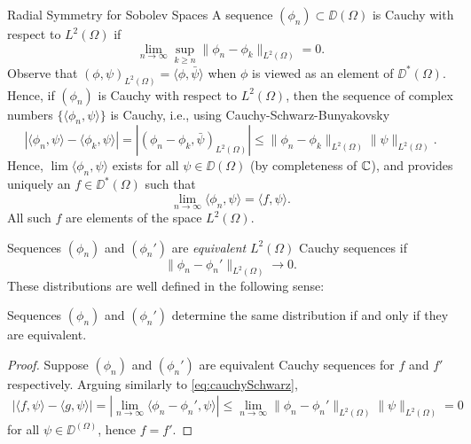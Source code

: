 \begin{chapter}{Radial Symmetry for Sobolev Spaces}
A sequence $(\phi_n)\subset \DD(\Omega)$ is Cauchy with respect to $L^2(\Omega)$ if
\begin{equation} 
  \lim_{n\to\infty}\sup_{k\ge n} \|\phi_n - \phi_k\|_{L^2(\Omega)} = 0.
\end{equation}
Observe that $(\phi,\psi)_{L^2(\Omega)} = \langle \phi,\bar{\psi}\rangle$ when $\phi$ is viewed as an element of $\DD^*(\Omega)$.
Hence, if $(\phi_n)$ is Cauchy with respect to $L^2(\Omega)$, then the sequence of complex numbers $\big\{\langle \phi_n,\psi\rangle\big\}$ is Cauchy, i.e., using Cauchy-Schwarz-Bunyakovsky
\begin{equation}
  |\langle \phi_n, \psi \rangle - \langle \phi_k,\psi\rangle| 
    = |(\phi_n - \phi_k,\bar{\psi})_{L^2(\Omega)}|  
    \le \|\phi_n - \phi_k\|_{L^2(\Omega)}\|\psi\|_{L^2(\Omega)}. \label{eq:cauchySchwarz}
\end{equation}
Hence, $\lim\langle \phi_n,\psi\rangle$ exists for all $\psi \in \DD(\Omega)$ (by completeness of $\mathbb C$), and  provides uniquely an $f \in \DD^*(\Omega)$ such that
\begin{equation}
  \lim_{n\to\infty} \langle \phi_n, \psi\rangle = \langle f,\psi\rangle.
\end{equation}
All such $f$ are elements of the space $L^2(\Omega)$.

Sequences $(\phi_n)$ and $(\phi_n')$ are \emph{equivalent} $L^2(\Omega)$ Cauchy sequences if
\begin{equation}\label{eq:cauchyEquivalence}
  \|\phi_n - \phi_n'\|_{L^2(\Omega)} \to 0.
\end{equation}
These distributions are well defined in the following sense: 
\begin{prop} \label{prop:cauchyCorrespondence}
  Sequences $(\phi_n)$ and $(\phi_n')$ determine the same distribution if and only if they are equivalent.
\end{prop}
\begin{com}
\begin{proof}
  Suppose $(\phi_n)$ and $(\phi_n')$ are equivalent Cauchy sequences for $f$ and $f'$ respectively.
  Arguing similarly to \eqref{eq:cauchySchwarz},
  \begin{align} 
    |\langle f, \psi\rangle - \langle g, \psi\rangle| = \left|\lim_{n\to \infty}\langle \phi_n - \phi_n', \psi\rangle\right| \le \lim_{n\to\infty}\|\phi_n - \phi_n'\|_{L^2(\Omega)}\|\psi\|_{L^2(\Omega)} =  0
  \end{align} 
  for all $\psi \in \DD^(\Omega)$, hence $f = f'$.


\end{proof}
\end{com}
\end{chapter}
